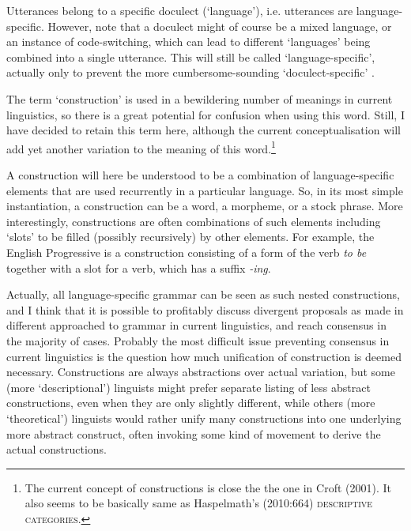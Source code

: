 Utterances belong to a specific doculect (`language'), i.e. utterances are language-specific. However, note that a doculect might of course be a mixed language, or an instance of code-switching, which can lead to different `languages' being combined into a single utterance. This will still be called `language-specific', actually only to prevent the more cumbersome-sounding `doculect-specific' .

%
The term `construction' is used in a bewildering number of meanings in current linguistics, so there is a great potential for confusion when using this word. Still, I have decided to retain this term here, although the current conceptualisation will add yet another variation to the meaning of this word.\footnote{The current concept of constructions is close the the one in Croft (2001). It also seems to be basically same as Haspelmath's (2010:664) \textsc{descriptive categories}.}

A construction will here be understood to be a combination of language-specific elements that are used recurrently in a particular language. So, in its most simple instantiation, a construction can be a word, a morpheme, or a stock phrase. More interestingly, constructions are often combinations of such elements including `slots' to be filled (possibly recursively) by other elements. For example, the English Progressive is a construction consisting of a form of the verb \emph{to be} together with a slot for a verb, which has a suffix \emph{-ing}.

Actually, all language-specific grammar can be seen as such nested constructions, and I think that it is possible to profitably discuss divergent proposals as made in different approached to grammar in current linguistics, and reach consensus in the majority of cases. Probably the most difficult issue preventing consensus in current linguistics is the question how much unification of construction is deemed necessary. Constructions are always abstractions over actual variation, but some (more `descriptional') linguists might prefer separate listing of less abstract constructions, even when they are only slightly different, while others (more `theoretical') linguists would rather unify many constructions into one underlying more abstract construct, often invoking some kind of movement to derive the actual constructions.

